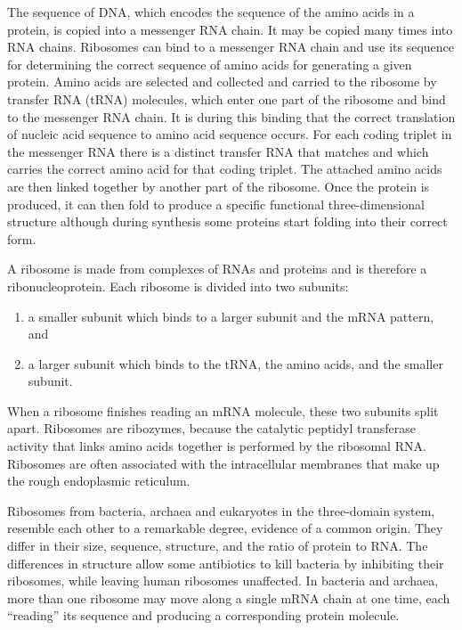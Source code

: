 The sequence of DNA, which encodes the sequence of the amino acids in a protein, is copied into a messenger RNA chain. It may be copied many times into RNA chains. Ribosomes can bind to a messenger RNA chain and use its sequence for determining the correct sequence of amino acids for generating a given protein. Amino acids are selected and collected and carried to the ribosome by transfer RNA (tRNA) molecules, which enter one part of the ribosome and bind to the messenger RNA chain. It is during this binding that the correct translation of nucleic acid sequence to amino acid sequence occurs. For each coding triplet in the messenger RNA there is a distinct transfer RNA that matches and which carries the correct amino acid for that coding triplet. The attached amino acids are then linked together by another part of the ribosome. Once the protein is produced, it can then fold to produce a specific functional three-dimensional structure although during synthesis some proteins start folding into their correct form.

A ribosome is made from complexes of RNAs and proteins and is therefore a ribonucleoprotein. Each ribosome is divided into two subunits:

\begin{enumerate}
\def\labelenumi{\arabic{enumi}.}
\tightlist
\item
  a smaller subunit which binds to a larger subunit and the mRNA pattern, and
\item
  a larger subunit which binds to the tRNA, the amino acids, and the smaller subunit.
\end{enumerate}

When a ribosome finishes reading an mRNA molecule, these two subunits split apart. Ribosomes are ribozymes, because the catalytic peptidyl transferase activity that links amino acids together is performed by the ribosomal RNA. Ribosomes are often associated with the intracellular membranes that make up the rough endoplasmic reticulum.

Ribosomes from bacteria, archaea and eukaryotes in the three-domain system, resemble each other to a remarkable degree, evidence of a common origin. They differ in their size, sequence, structure, and the ratio of protein to RNA. The differences in structure allow some antibiotics to kill bacteria by inhibiting their ribosomes, while leaving human ribosomes unaffected. In bacteria and archaea, more than one ribosome may move along a single mRNA chain at one time, each ``reading'' its sequence and producing a corresponding protein molecule.

